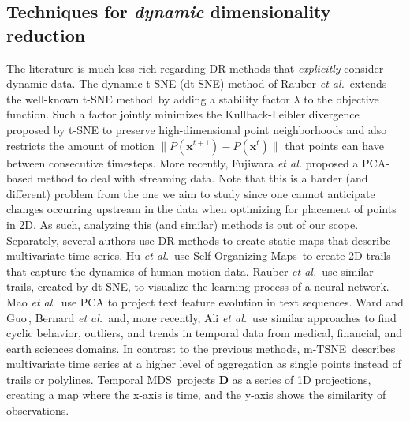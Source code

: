 \subsection{Techniques for \emph{dynamic} dimensionality reduction}
%
The literature is much less rich regarding DR methods that \emph{explicitly} consider dynamic data. The dynamic t-SNE (dt-SNE) method of Rauber \emph{et al.}\,\cite{Rauber2016} extends the well-known t-SNE method\,\cite{tsne} by adding a stability factor $\lambda$ to the objective function. Such a factor jointly minimizes the Kullback-Leibler divergence proposed by t-SNE to preserve high-dimensional point neighborhoods and also restricts the amount of motion $\| P(\mathbf{x}^{t+1}) - P(\mathbf{x}^t) \|$ that points can have between consecutive timesteps. More recently, Fujiwara \emph{et al.}\cite{Fujiwara2019} proposed a PCA-based method to deal with streaming data. Note that this is a harder (and different) problem from the one we aim to study since one cannot anticipate changes occurring upstream in the data when optimizing for placement of points in 2D. As such, analyzing this (and similar) methods is out of our scope. Separately, several authors use DR methods to create static maps that describe multivariate time series. Hu \emph{et al.}\,\cite{Hu2010} use Self-Organizing Maps\,\cite{Kohonen1997} to create 2D trails that capture the dynamics of human motion data. Rauber \emph{et al.}\,\cite{rauber17} use similar trails, created by dt-SNE, to visualize the learning process of a neural network. Mao \emph{et al.}\,\cite{Mao2007} use PCA to project text feature evolution in text sequences. Ward and Guo\,\cite{Ward2011}, Bernard \emph{et al.}\,\cite{Bernard2012} and, more recently, Ali \emph{et al.}\,\cite{Ali2019} use similar approaches to find cyclic behavior, outliers, and trends in temporal data from medical, financial, and earth sciences domains.
%
In contrast to the previous methods, m-TSNE\,\cite{Nguyen2017} describes multivariate time series at a higher level of aggregation as single points instead of trails or polylines. Temporal MDS\,\cite{Jackle2016} projects $\mathbf{D}$ as a series of 1D projections, creating a map where the x-axis is time, and the y-axis shows the similarity of observations.

